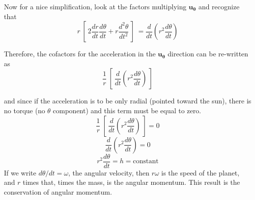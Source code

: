 \documentclass[11pt, oneside]{article}
\begin{document}
Now for a nice simplification, look at the factors multiplying $\mathbf{u_{\theta}}$ and recognize that
\[ r \ [ \ 2 \frac{dr}{dt} \frac{d\theta}{dt} + r \frac{d^2\theta}{dt^2} \ ] \  = \frac{d}{dt} ( r^2 \frac{d\theta}{dt}) \]

Therefore, the cofactors for the acceleration in the $\mathbf{u_{\theta}}$ direction can be re-written as
\[ \frac{1}{r} \ [ \ \frac{d}{dt} ( r^2 \frac{d\theta}{dt}) \ ] \]

and since if the acceleration is to be only radial (pointed toward the sun), there is no torque (no $\theta$ component) and this term must be equal to zero.
\[ \frac{1}{r} \ [ \ \frac{d}{dt} ( r^2 \frac{d\theta}{dt}) \ ]  = 0 \]
\[ \frac{d}{dt} ( r^2 \frac{d\theta}{dt}) = 0 \]
\[ r^2 \frac{d\theta}{dt} = h = \text{constant} \]
If we write $d\theta/dt = \omega$, the angular velocity, then $r \omega$ is the speed of the planet, and $r$ times that, times the mass, is the angular momentum.  This result is the conservation of angular momentum.
\end{document}
